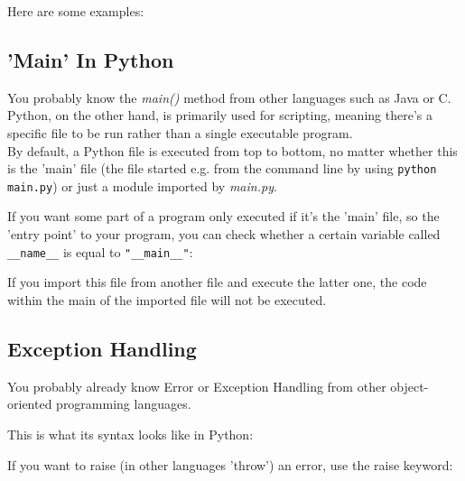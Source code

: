         
      Here are some examples:
      

  \subsection{'Main' In Python}
    You probably know the \textit{main()} method from other languages such as Java or C. \\
    Python, on the other hand, is primarily used for scripting, meaning there's a specific file
    to be run rather than a single executable program. \\
    By default, a Python file is executed from top to bottom, no matter whether this is the
    'main' file (the file started e.g. from the command line by using
    \texttt{python main.py}) or just a module imported by \textit{main.py}.

    If you want some part of a program only executed if it's the 'main' file, so the 'entry point'
    to your program, you can check whether a certain variable called \texttt{__name__}
    is equal to \texttt{"__main__"}:


    If you import this file from another file and execute the latter one, the code within the main
    of the imported file will not be executed.
      
  
  \subsection{Exception Handling}
    You probably already know Error or Exception Handling from other object-oriented
    programming languages.
    
    This is what its syntax looks like in Python:

    If you want to raise (in other languages 'throw') an error, use the raise keyword:

